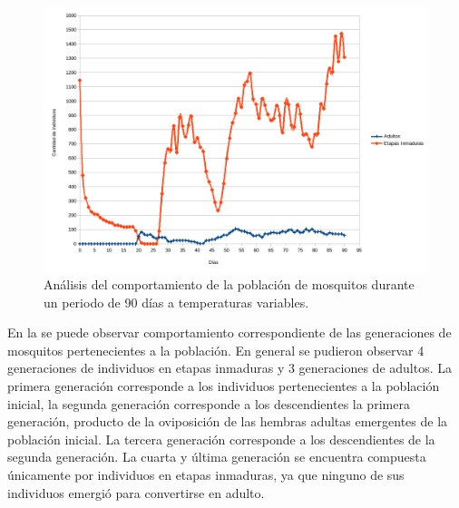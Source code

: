 \begin{figure}[!htbp]
    \centering
    \includegraphics[width=\textwidth]{capitulo-6/graphics/temp-var-90-poblacion.png}
    \caption{\label{fig:temp-var-poblacion} Análisis del comportamiento de la población de mosquitos durante un periodo de 90 días a temperaturas variables.}
\end{figure}

En la  se puede observar comportamiento correspondiente de las
generaciones de mosquitos pertenecientes a la población. En general se pudieron observar 4
generaciones de individuos en etapas inmaduras y 3 generaciones de adultos. La primera generación
corresponde a los individuos pertenecientes a la población inicial, la segunda generación
corresponde a los descendientes la primera generación, producto de la oviposición de las hembras
adultas emergentes de la población inicial. La tercera generación corresponde a los descendientes
de la segunda generación. La cuarta y última generación se encuentra compuesta únicamente por
individuos en etapas inmaduras, ya que ninguno de sus individuos emergió para convertirse en adulto.

